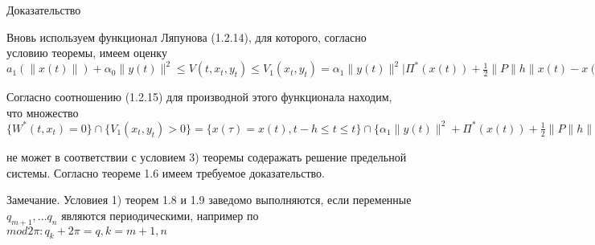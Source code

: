 
Доказательство

Вновь используем функционал Ляпунова (1.2.14), для которого, согласно условию теоремы, имеем оценку $a_1 (\| x(t) \|) + \alpha_0 \| y(t) \|^2 \le V(t, x_t, y_t) \le V_1 (x_t, y_t) = \alpha_1 \|y(t)\|^2 | \Pi^{*} (x(t)) + \frac12 \| P \| h \| x(t) - x(\tau) \|^2$

Согласно соотношению (1.2.15) для производной этого функционала находим, что множество $\lbrace W^{*} (t, x_t) = 0 \rbrace \cap \lbrace V_1(x_t, y_t) > 0 \rbrace = \lbrace x(\tau) = x(t), t-h \le t \le t \rbrace \cap \lbrace \alpha_1 \| y(t) \|^2 + \Pi^{*} (x(t)) + \frac12 \| P\| h \| x(t) - x(\tau) \|^2 > 0 \rbrace \equiv \lbrace \Pi^{*} (x(t)) > 0 \rbrace$

не может в соответствии с условием 3) теоремы содеражать решение предельной системы. Согласно теореме 1.6 имеем требуемое доказательство.

Замечание. Условиея 1) теорем 1.8 и 1.9 заведомо выполняются, если переменные $q_{m+1}, ... q_n$ являются периодическими, например по $mod 2 \pi: q_k + 2 \pi = q, k = m + 1, n$